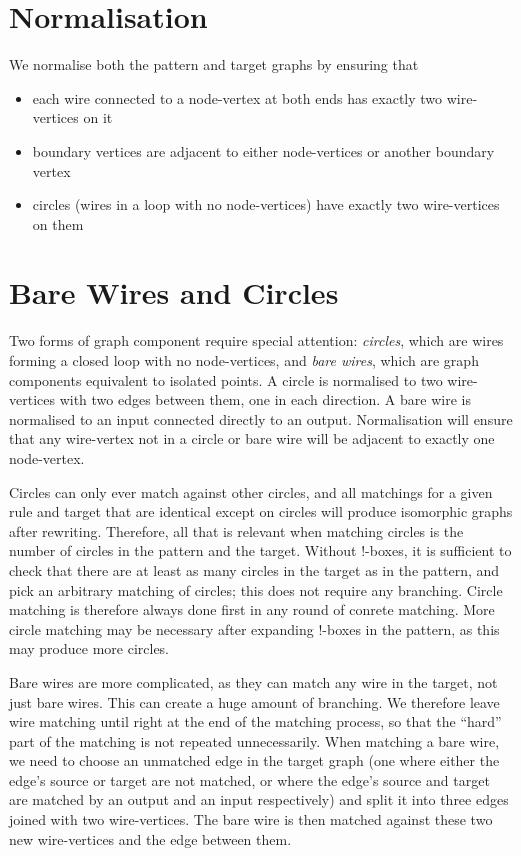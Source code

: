 \documentclass{article}
\begin{document}
\section{Normalisation}
\label{sec:normalisation}

We normalise both the pattern and target graphs by ensuring that
\begin{itemize}
\item each wire connected to a node-vertex at both ends has exactly two wire-vertices on it
\item boundary vertices are adjacent to either node-vertices or another boundary vertex
\item circles (wires in a loop with no node-vertices) have exactly two wire-vertices on them
\end{itemize}

\section{Bare Wires and Circles}
\label{sec:wires-and-circles}

Two forms of graph component require special attention: \emph{circles}, which are wires forming a closed loop with no node-vertices, and \emph{bare wires}, which are graph components equivalent to isolated points.  A circle is normalised to two wire-vertices with two edges between them, one in each direction.  A bare wire is normalised to an input connected directly to an output.  Normalisation will ensure that any wire-vertex not in a circle or bare wire will be adjacent to exactly one node-vertex.

Circles can only ever match against other circles, and all matchings for a given rule and target that are identical except on circles will produce isomorphic graphs after rewriting.  Therefore, all that is relevant when matching circles is the number of circles in the pattern and the target.  Without $!$-boxes, it is sufficient to check that there are at least as many circles in the target as in the pattern, and pick an arbitrary matching of circles; this does not require any branching.  Circle matching is therefore always done first in any round of conrete matching.  More circle matching may be necessary after expanding $!$-boxes in the pattern, as this may produce more circles.

Bare wires are more complicated, as they can match any wire in the target, not just bare wires.  This can create a huge amount of branching.  We therefore leave wire matching until right at the end of the matching process, so that the ``hard'' part of the matching is not repeated unnecessarily.  When matching a bare wire, we need to choose an unmatched edge in the target graph (one where either the edge's source or target are not matched, or where the edge's source and target are matched by an output and an input respectively) and split it into three edges joined with two wire-vertices.  The bare wire is then matched against these two new wire-vertices and the edge between them.
\end{document}
